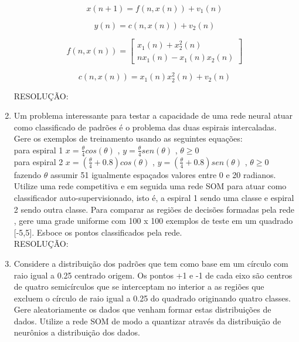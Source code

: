 \documentclass[a4paper,oneside,12pt]{article}
\begin{document}
\begin{enumerate}[1.]
\begin{equation*}
x(n+1) = f(n, x(n)) + v_{1}(n)
\end{equation*}

\begin{equation*}
y(n) = c(n,x(n)) + v_{2}(n)
\end{equation*}

\begin{equation*}
f(n, x(n)) = \begin{bmatrix}
x_{1}(n) + x_{2}^{2}(n) \\
nx_{1}(n) - x_{1}(n)x_{2}(n)
\end{bmatrix}
\end{equation*}

\begin{equation*}
c(n, x(n)) = x_{1}(n)x_{2}^{2}(n) + v_{2}(n)
\end{equation*}

RESOLU\c{C}\~AO: \\

\item Um problema interessante para testar a capacidade de uma rede neural atuar como classificado de padr\~oes \'e o problema das duas espirais intercaladas. Gere os exemplos de treinamento usando as seguintes equa\c{c}\~oes: \\
para espiral 1 $x = \frac{\theta}{4} cos(\theta)$ , $y = \frac{\theta}{4} sen(\theta)$ , $\theta \geq 0$ \\
para espiral 2 $x = (\frac{\theta}{4} + 0.8) cos(\theta)$ , $y = (\frac{\theta}{4} + 0.8) sen(\theta)$ , $\theta \geq 0$ \\
fazendo $\theta$ assumir 51 igualmente espa\c{c}ados valores entre 0 e 20 radianos. Utilize uma rede competitiva e em seguida uma rede SOM para atuar como classificador auto-supervisionado, isto \'e, a espiral 1 sendo uma classe e espiral 2 sendo outra classe. Para comparar as regi\~oes de decis\~oes formadas pela rede , gere uma grade uniforme com 100 x 100 exemplos de teste em um quadrado [-5,5]. Esboce os pontos classificados pela rede. \\

RESOLU\c{C}\~AO: \\

\item Considere a distribui\c{c}\~ao dos padr\~oes que tem como base em um c\'irculo com raio igual a 0.25 centrado origem. Os pontos +1 e -1 de cada eixo s\~ao centros de quatro semic\'irculos que se interceptam no interior a as regi\~oes que excluem o c\'irculo de raio igual a 0.25 do quadrado originando quatro classes. Gere aleatoriamente os dados que venham formar estas distribui\c{c}\~oes de dados. Utilize a rede SOM de modo a quantizar atrav\'es da distribui\c{c}\~ao de neur\^onios a distribui\c{c}\~ao dos dados. \\


\end{enumerate}
\end{document}
